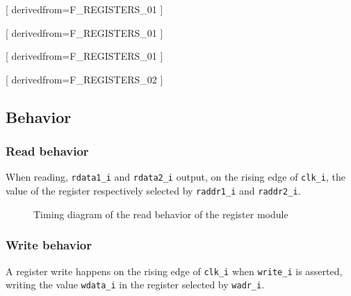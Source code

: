       [
          derivedfrom=F\_REGISTERS\_01
        ]

      [
          derivedfrom=F\_REGISTERS\_01
        ]

      [
          derivedfrom=F\_REGISTERS\_01
        ]

      [
          derivedfrom=F\_REGISTERS\_02
        ]

  \subsection{Behavior}

    \subsubsection{Read behavior}

      \begin{content}
          When reading, \texttt{rdata1\_i} and \texttt{rdata2\_i} output, on the rising edge of \texttt{clk\_i}, the value of the register respectively selected by \texttt{raddr1\_i} and \texttt{raddr2\_i}.
        \end{content}

      \begin{figure}[H]
          \centering
          
          \caption{Timing diagram of the read behavior of the register module}
          \label{fig:regm-behavior-read}
        \end{figure}

    \subsubsection{Write behavior}

      \begin{content}
          A register write happens on the rising edge of \texttt{clk\_i} when \texttt{write\_i} is asserted, writing the value \texttt{wdata\_i} in the register selected by \texttt{wadr\_i}.
        \end{content}

